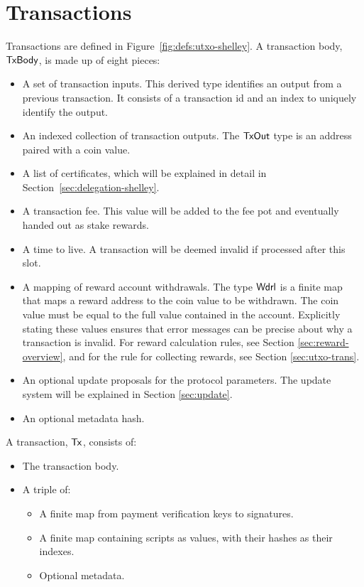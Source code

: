 \section{Transactions}
\label{sec:transactions}

Transactions are defined in Figure~\ref{fig:defs:utxo-shelley}.
A transaction body, $\mathsf{TxBody}$, is made up of eight pieces:

\begin{itemize}
  \item A set of transaction inputs.
    This derived type identifies an output from a previous transaction.
    It consists of a transaction id and an index to uniquely identify the output.
  \item An indexed collection of transaction outputs.
    The $\mathsf{TxOut}$ type is an address paired with a coin value.
  \item A list of certificates, which will be explained in detail in
    Section~\ref{sec:delegation-shelley}.
  \item A transaction fee. This value will be added to the fee pot and eventually handed out
    as stake rewards.
  \item A time to live. A transaction will be deemed invalid if processed after this slot.
  \item A mapping of reward account withdrawals.  The type $\mathsf{Wdrl}$ is a finite map that maps
    a reward address to the coin value to be withdrawn. The coin value must be equal
    to the full value contained in the account. Explicitly stating these values ensures
    that error messages can be precise about why a transaction is invalid.
    For reward calculation rules, see Section \ref{sec:reward-overview},
    and for the rule for collecting rewards, see Section \ref{sec:utxo-trans}.
  \item An optional update proposals for the protocol parameters.
    The update system will be explained in Section \ref{sec:update}.
  \item An optional metadata hash.
\end{itemize}

A transaction, $\mathsf{Tx}$, consists of:

\begin{itemize}
  \item The transaction body.
  \item A triple of:
    \begin{itemize}
      \item A finite map from payment verification keys to signatures.
      \item A finite map containing scripts as values, with their hashes as
      their indexes.
      \item Optional metadata.
    \end{itemize}
\end{itemize}

